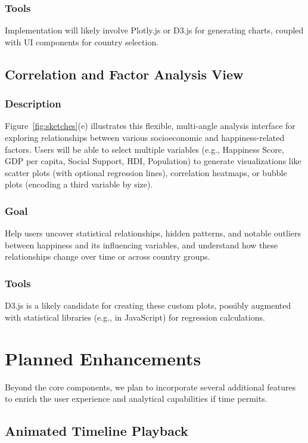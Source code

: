 \documentclass[10pt,conference,compsocconf]{IEEEtran}
\begin{document}
\subsubsection{Tools}
Implementation will likely involve Plotly.js or D3.js for generating charts, coupled with UI components for country selection.

\subsection{Correlation and Factor Analysis View}
\subsubsection{Description}
Figure~\ref{fig:sketches}(e) illustrates this flexible, multi-angle analysis interface for exploring relationships between various socioeconomic and happiness-related factors. Users will be able to select multiple variables (e.g., Happiness Score, GDP per capita, Social Support, HDI, Population) to generate visualizations like scatter plots (with optional regression lines), correlation heatmaps, or bubble plots (encoding a third variable by size).
\subsubsection{Goal}
Help users uncover statistical relationships, hidden patterns, and notable outliers between happiness and its influencing variables, and understand how these relationships change over time or across country groups.
\subsubsection{Tools}
D3.js is a likely candidate for creating these custom plots, possibly augmented with statistical libraries (e.g., in JavaScript) for regression calculations.

\section{Planned Enhancements}\label{sec:enhance}
Beyond the core components, we plan to incorporate several additional features to enrich the user experience and analytical capabilities if time permits.

\subsection{Animated Timeline Playback}
\end{document}
